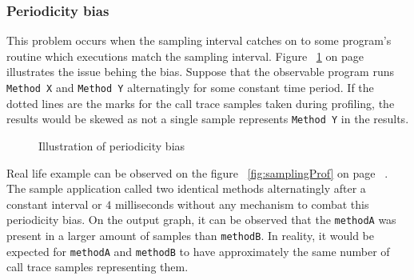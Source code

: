 \documentclass[..thesis.tex]{subfiles}
\begin{document}
\subsubsection{Periodicity bias}
This problem occurs when the sampling interval catches on to some program's routine which executions match the sampling interval. Figure ~\ref{fig:periodicityBias} on page ~\pageref{fig:periodicityBias} illustrates the issue behing the bias. Suppose that the observable program runs \texttt{Method X} and \texttt{Method Y} alternatingly for some constant time period. If the dotted lines are the marks for the call trace samples taken during profiling, the results would be skewed as not a single sample represents \texttt{Method Y} in the results.

\begin{figure}[H]
\centering
{}
\caption{Illustration of periodicity bias}
\label{fig:periodicityBias}
\end{figure}

Real life example can be observed on the figure ~\ref{fig:samplingProf} on page ~\pageref{fig:samplingProf}. The sample application called two identical methods alternatingly after a constant interval or $4$ milliseconds without any mechanism to combat this periodicity bias. On the output graph, it can be observed that the \texttt{methodA} was present in a larger amount of samples than \texttt{methodB}. In reality, it would be expected for \texttt{methodA} and \texttt{methodB} to have approximately the same number of call trace samples representing them.
\end{document}

